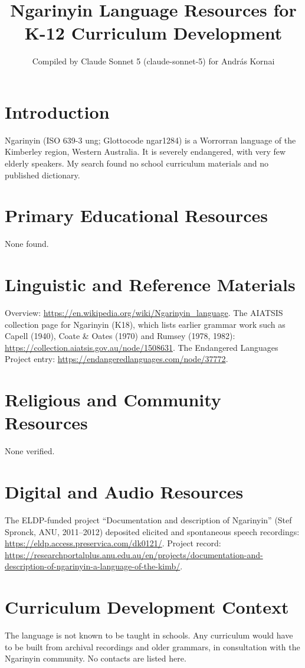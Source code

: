 \documentclass[12pt]{article}
\title{Ngarinyin Language Resources for K-12 Curriculum Development}
\author{Compiled by Claude Sonnet 5 (claude-sonnet-5) for Andr\'as Kornai}
\date{}
\begin{document}
\maketitle
\section{Introduction}
Ngarinyin (ISO 639-3 ung; Glottocode ngar1284) is a Worrorran language of the Kimberley region, Western Australia. It is severely endangered, with very few elderly speakers. My search found no school curriculum materials and no published dictionary.
\section{Primary Educational Resources}
None found.
\section{Linguistic and Reference Materials}
Overview: \url{https://en.wikipedia.org/wiki/Ngarinyin_language}. The AIATSIS collection page for Ngarinyin (K18), which lists earlier grammar work such as Capell (1940), Coate \& Oates (1970) and Rumsey (1978, 1982): \url{https://collection.aiatsis.gov.au/node/1508631}. The Endangered Languages Project entry: \url{https://endangeredlanguages.com/node/37772}.
\section{Religious and Community Resources}
None verified.
\section{Digital and Audio Resources}
The ELDP-funded project ``Documentation and description of Ngarinyin'' (Stef Spronck, ANU, 2011--2012) deposited elicited and spontaneous speech recordings: \url{https://eldp.access.preservica.com/dk0121/}. Project record: \url{https://researchportalplus.anu.edu.au/en/projects/documentation-and-description-of-ngarinyin-a-language-of-the-kimb/}.
\section{Curriculum Development Context}
The language is not known to be taught in schools. Any curriculum would have to be built from archival recordings and older grammars, in consultation with the Ngarinyin community. No contacts are listed here.
\end{document}
